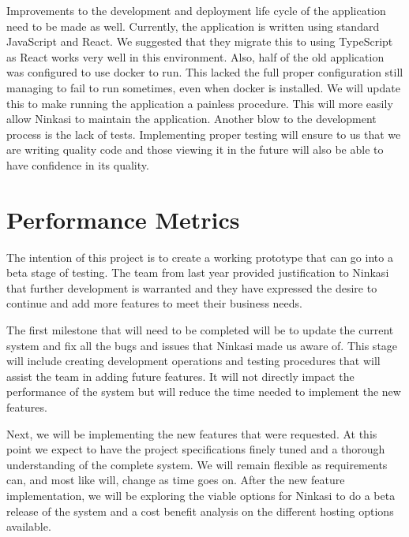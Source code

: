 \documentclass[draftclsnofoot,onecolumn,journal,letterpaper,10pt]{IEEEtran}
\begin{document}
Improvements to the development and deployment life cycle of the application need to be made as well. Currently, the application is written using standard JavaScript and React.  We suggested that they migrate this to using TypeScript as React works very well in this environment.  Also, half of the old application was configured to use docker to run.  This lacked the full proper configuration still managing to fail to run sometimes, even when docker is installed. We will update this to make running the application a painless procedure. This will more easily allow Ninkasi to maintain the application. Another blow to the development process is the lack of tests. Implementing proper testing will ensure to us that we are writing quality code and those viewing it in the future will also be able to have confidence in its quality.

\section{Performance Metrics}

The intention of this project is to create a working prototype that can go into a beta stage of testing. The team from last year provided justification to Ninkasi that further development is warranted and they have expressed the desire to continue and add more features to meet their business needs. 

The first milestone that will need to be completed will be to update the current system and fix all the bugs and issues that Ninkasi made us aware of. This stage will include creating development operations and testing procedures that will assist the team in adding future features. It will not directly impact the performance of the system but will reduce the time needed to implement the new features.

Next, we will be implementing the new features that were requested. At this point we expect to have the project specifications finely tuned and a thorough understanding of the complete system. We will remain flexible as requirements can, and most like will, change as time goes on. After the new feature implementation, we will be exploring the viable options for Ninkasi to do a beta release of the system and a cost benefit analysis on the different hosting options available.
\end{document}
